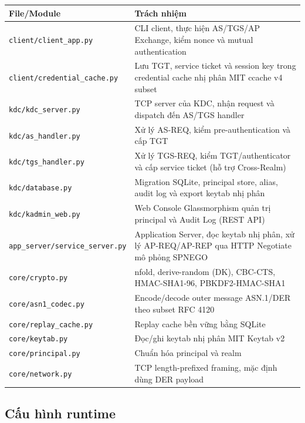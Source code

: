 \documentclass[12pt]{article}
\begin{document}
\begin{table}[H]
\centering
\renewcommand{\arraystretch}{1.25}
\begin{tabularx}{\textwidth}{|p{6cm}|X|}
\hline
\textbf{File/Module} & \textbf{Trách nhiệm} \\
\hline
\texttt{client/client\_app.py} & CLI client, thực hiện AS/TGS/AP Exchange, kiểm nonce và mutual authentication \\
\hline
\texttt{client/credential\_cache.py} & Lưu TGT, service ticket và session key trong credential cache nhị phân MIT ccache v4 subset \\
\hline
\texttt{kdc/kdc\_server.py} & TCP server của KDC, nhận request và dispatch đến AS/TGS handler \\
\hline
\texttt{kdc/as\_handler.py} & Xử lý AS-REQ, kiểm pre-authentication và cấp TGT \\
\hline
\texttt{kdc/tgs\_handler.py} & Xử lý TGS-REQ, kiểm TGT/authenticator và cấp service ticket (hỗ trợ Cross-Realm) \\
\hline
\texttt{kdc/database.py} & Migration SQLite, principal store, alias, audit log và export keytab nhị phân \\
\hline
\texttt{kdc/kadmin\_web.py} & Web Console Glassmorphism quản trị principal và Audit Log (REST API) \\
\hline
\texttt{app\_server/service\_server.py} & Application Server, đọc keytab nhị phân, xử lý AP-REQ/AP-REP qua HTTP Negotiate mô phỏng SPNEGO \\
\hline
\texttt{core/crypto.py} & nfold, derive-random (DK), CBC-CTS, HMAC-SHA1-96, PBKDF2-HMAC-SHA1 \\
\hline
\texttt{core/asn1\_codec.py} & Encode/decode outer message ASN.1/DER theo subset RFC 4120 \\
\hline
\texttt{core/replay\_cache.py} & Replay cache bền vững bằng SQLite \\
\hline
\texttt{core/keytab.py} & Đọc/ghi keytab nhị phân MIT Keytab v2 \\
\hline
\texttt{core/principal.py} & Chuẩn hóa principal và realm \\
\hline
\texttt{core/network.py} & TCP length-prefixed framing, mặc định dùng DER payload \\
\hline
\end{tabularx}
\end{table}

\subsection{Cấu hình runtime}
\end{document}
